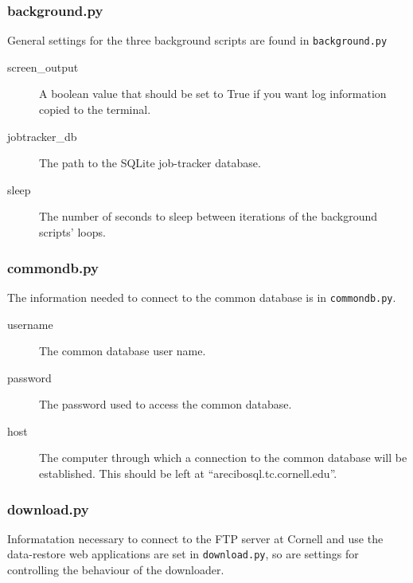 \subsubsection{background.py}
General settings for the three background scripts are found in \texttt{background.py}

\begin{description}
    \item[screen\_output] A boolean value that should be set to True if you want log information copied to the terminal.
    \item[jobtracker\_db] The path to the SQLite job-tracker database.
    \item[sleep] The number of seconds to sleep between iterations of the background scripts' loops.
\end{description}


\subsubsection{commondb.py}
The information needed to connect to the common database is in \texttt{commondb.py}.

\begin{description}
    \item[username] The common database user name.
    \item[password] The password used to access the common database.
    \item[host] The computer through which a connection to the common database will be established. This should be left at ``arecibosql.tc.cornell.edu''.
\end{description}


\subsubsection{download.py}
Informatation necessary to connect to the FTP server at Cornell and use the data-restore web applications are set in \texttt{download.py}, so are settings for controlling the behaviour of the downloader.

